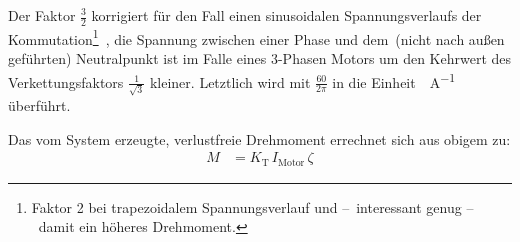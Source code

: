 		Der Faktor \(\frac{3}{2}\) korrigiert für den Fall einen sinusoidalen Spannungsverlaufs der Kommutation\footnote{\hspace{1mm}Faktor 2 bei trapezoidalem Spannungsverlauf und --~interessant genug --~damit ein höheres Drehmoment.}~\cites{mevey2009sensorless}{DalY.Ohm.2000}, die Spannung zwischen einer Phase und dem~(nicht nach außen geführten) Neutralpunkt ist im Falle eines 3-Phasen Motors um den Kehrwert des Verkettungsfaktors \(\frac{1}{\sqrt{3}}\) kleiner.
		Letztlich wird mit \(\frac{60}{2\pi}\) in die Einheit~\unit{\newtonmetre\per\ampere} überführt.\par\medskip
		Das vom System erzeugte, verlustfreie Drehmoment errechnet sich aus obigem zu:
		\begin{align}
			M	&= K_\text{T} \, I_\text{Motor} \, \zeta
			\label{eq:frictionless torque}
		\end{align}%
		\nocite{Meschede.2015}\nocite{Demtroder.2018}
